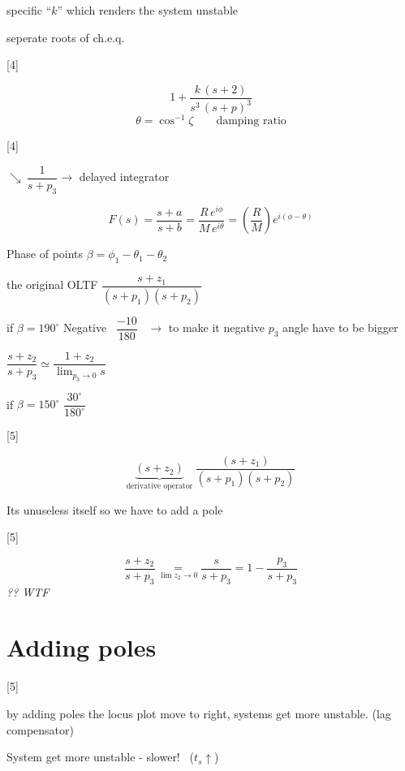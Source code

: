 \documentclass[11pt,a4paper]{article}
\begin{document}
\noindent specific ``$k$'' which renders the system unstable

 seperate roots of ch.e.q.

[4]

\[
1 + \frac{k\,(s+2)}{s^3\,(s+p)^3}
\]
\[
\theta = \cos^{-1}\zeta \qquad \text{damping ratio}
\]

[4]

\noindent $\searrow\ \dfrac{1}{s+p_3} \rightarrow$ delayed integrator

\[
F(s) = \frac{s+a}{s+b} = \frac{R\,e^{i\phi}}{M\,e^{i\theta}} = \left(\frac{R}{M}\right) e^{i(\phi-\theta)}
\]

\noindent Phase of  points \quad $\beta = \phi_1 - \theta_1 - \theta_2$

\noindent the original OLTF \quad $\dfrac{s+z_1}{(s+p_1)(s+p_2)}$

\noindent if $\beta = 190^\circ$ \quad Negative \ $\dfrac{-10}{180}$ \ $\rightarrow$ to make it negative $p_3$ angle have to be bigger

\medskip
\noindent {} \quad $\dfrac{s+z_2}{s+p_3} \simeq \dfrac{1+z_2}{\lim_{p_3\to 0} s}$

\noindent if $\beta = 150^\circ$ \quad $\dfrac{30^\circ}{180^\circ}$

[5]

\[
\underbrace{(s+z_2)}_{\text{derivative operator}}\ \frac{(s+z_1)}{(s+p_1)(s+p_2)}
\]

\noindent Its unuseless itself so we have to add a pole

[5]

\[
\frac{s+z_2}{s+p_3} \underset{\lim z_2\to 0}{=} \frac{s}{s+p_3} = 1 - \frac{p_3}{s+p_3}
\]
\noindent \textit{?? WTF}

\section{Adding poles}

[5]

\noindent by adding poles the locus plot move to right, systems get more unstable. \hfill (lag compensator)

\noindent \textcolor{kirmizikalem}{System get more unstable - slower! \ ($t_s\uparrow$)}
\end{document}
